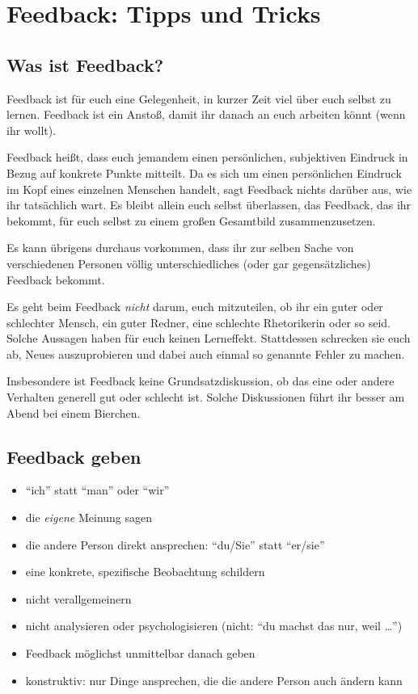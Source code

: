 \section{Feedback: Tipps und Tricks}

\subsection{Was ist Feedback?}
Feedback ist für euch eine Gelegenheit, in kurzer Zeit viel über euch selbst zu lernen. Feedback ist ein Anstoß, damit ihr danach an euch arbeiten könnt (wenn ihr wollt).

Feedback heißt, dass euch jemandem einen persönlichen, subjektiven Eindruck in Bezug auf konkrete Punkte mitteilt. Da es sich um einen persönlichen Eindruck im Kopf eines einzelnen Menschen handelt, sagt Feedback nichts darüber aus, wie ihr tatsächlich wart. Es bleibt allein euch selbst überlassen, das Feedback, das ihr bekommt, für euch selbst zu einem großen Gesamtbild zusammenzusetzen.

Es kann übrigens durchaus vorkommen, dass ihr zur selben Sache von verschiedenen Personen völlig unterschiedliches (oder gar gegensätzliches) Feedback bekommt.

Es geht beim Feedback \emph{nicht} darum, euch mitzuteilen, ob ihr ein guter oder schlechter Mensch, ein guter Redner, eine schlechte Rhetorikerin oder so seid. Solche Aussagen haben für euch keinen Lerneffekt. Stattdessen schrecken sie euch ab, Neues auszuprobieren und dabei auch einmal so genannte Fehler zu machen.

Insbesondere ist Feedback keine Grundsatzdiskussion, ob das eine oder andere Verhalten generell gut oder schlecht ist. Solche Diskussionen führt ihr besser am Abend bei einem Bierchen.

\subsection{Feedback geben}
\begin{itemize}
  \item  "`ich"' statt "`man"' oder "`wir"'
  \item die \emph{eigene} Meinung sagen
  \item die andere Person direkt ansprechen: "`du/Sie"' statt "`er/sie"'
  \item eine konkrete, spezifische Beobachtung schildern
  \item nicht verallgemeinern
  \item nicht analysieren oder psychologisieren (nicht: "`du machst das nur, weil \ldots"')
  \item Feedback möglichst unmittelbar danach geben
  \item konstruktiv: nur Dinge ansprechen, die die andere Person auch ändern kann
\end{itemize}

